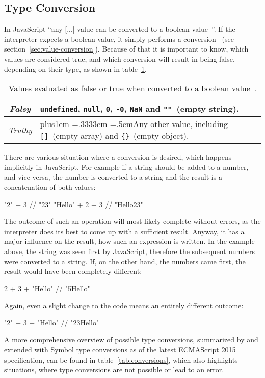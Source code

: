 \subsection{Type Conversion}
\label{sec:type-conversion}

In JavaScript ``any [...] value can be converted to a boolean value~\cite[p.~40]{JavaScriptTheDefinitiveGuide:Flanagan:2011}''. If the interpreter expects a boolean value, it simply performs a conversion~\cite[p.~46]{JavaScriptTheDefinitiveGuide:Flanagan:2011} (see section~\ref{sec:value-conversion}). Because of that it is important to know, which values are considered true, and which conversion will result in being false, depending on their type, as shown in table~\ref{tab:truthy-falsy}.
\begin{table}
\caption{Values evaluated as false or true when converted to a boolean value~\cite[p.~40]{JavaScriptTheDefinitiveGuide:Flanagan:2011}.}\label{tab:truthy-falsy}
\centering
  \def\rr{\rightskip=0pt plus1em \spaceskip=.3333em \xspaceskip=.5em\relax}
  \setlength{\tabcolsep}{1ex}
  \def\arraystretch{1.20}
  \setlength{\tabcolsep}{1ex}
  \begin{tabular}{|c||l|}
    \hline
    \emph{Falsy} & \texttt{undefined}, \texttt{null}, \texttt{0}, \texttt{-0}, \texttt{NaN} and \texttt{""}~(empty string). \\
    \hline
    \emph{Truthy} & {\rr Any other value, including \texttt{[]}~(empty array) and \texttt{\{\}}~(empty object). } \\
    \hline
  \end{tabular}
\end{table}
There are various situation where a conversion is desired, which happens implicitly in JavaScript. For example if a string should be added to a number, and vice versa, the number is converted to a string and the result is a concatenation of both values:
\begin{JsCode}[numbers=none]
"2" + 3 // "23"
"Hello" + 2 + 3 // "Hello23"
\end{JsCode}
The outcome of such an operation will most likely complete without errors, as the interpreter does its best to come up with a sufficient result. Anyway, it has a major influence on the result, how such an expression is written. In the example above, the string was seen first by JavaScript, therefore the subsequent numbers were converted to a string. If, on the other hand, the numbers came first, the result would have been completely different:
\begin{JsCode}[numbers=none]
2 + 3 + "Hello" // "5Hello"
\end{JsCode}
Again, even a slight change to the code means an entirely different outcome:
\begin{JsCode}[numbers=none]
"2" + 3 + "Hello" // "23Hello"
\end{JsCode}
A more comprehensive overview of possible type conversions, summarized by \citeauthor{JavaScriptTheDefinitiveGuide:Flanagan:2011} and extended with Symbol type conversions as of the latest ECMAScript 2015 specification, can be found in table~\ref{tab:conversions}, which also highlights situations, where type conversions are not possible or lead to an error.

